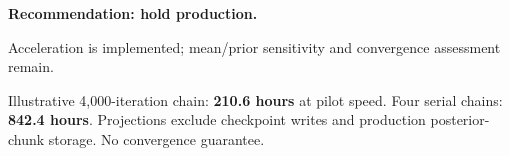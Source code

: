 \textbf{Recommendation: hold production.}\par\medskip\small Acceleration is implemented; mean/prior sensitivity and convergence assessment remain. \par\medskip
Illustrative 4,000-iteration chain: \textbf{210.6 hours} at pilot speed. Four serial chains: \textbf{842.4 hours}. Projections exclude checkpoint writes and production posterior-chunk storage. No convergence guarantee.
